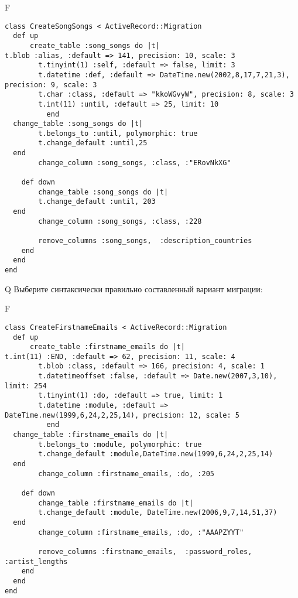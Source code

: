 F
\begin{verbatim}
class CreateSongSongs < ActiveRecord::Migration
  def up
	  create_table :song_songs do |t|
t.blob :alias, :default => 141, precision: 10, scale: 3
		t.tinyint(1) :self, :default => false, limit: 3
		t.datetime :def, :default => DateTime.new(2002,8,17,7,21,3), precision: 9, scale: 3
		t.char :class, :default => "kkoWGvyW", precision: 8, scale: 3
		t.int(11) :until, :default => 25, limit: 10
		  end
  change_table :song_songs do |t|
		t.belongs_to :until, polymorphic: true
 		t.change_default :until,25
  end
 		change_column :song_songs, :class, :"ERovNkXG"
   
	def down
		change_table :song_songs do |t|
		t.change_default :until, 203
  end
 		change_column :song_songs, :class, :228
   
		remove_columns :song_songs,  :description_countries 
    end 
  end
end

\end{verbatim}

Q
Выберите синтаксически правильно составленный вариант миграции:

F
\begin{verbatim}
class CreateFirstnameEmails < ActiveRecord::Migration
  def up
	  create_table :firstname_emails do |t|
t.int(11) :END, :default => 62, precision: 11, scale: 4
		t.blob :class, :default => 166, precision: 4, scale: 1
		t.datetimeoffset :false, :default => Date.new(2007,3,10), limit: 254
		t.tinyint(1) :do, :default => true, limit: 1
		t.datetime :module, :default => DateTime.new(1999,6,24,2,25,14), precision: 12, scale: 5
		  end
  change_table :firstname_emails do |t|
		t.belongs_to :module, polymorphic: true
 		t.change_default :module,DateTime.new(1999,6,24,2,25,14)
  end
 		change_column :firstname_emails, :do, :205
   
	def down
		change_table :firstname_emails do |t|
		t.change_default :module, DateTime.new(2006,9,7,14,51,37)
  end
 		change_column :firstname_emails, :do, :"AAAPZYYT"
   
		remove_columns :firstname_emails,  :password_roles, :artist_lengths 
    end 
  end
end

\end{verbatim}


